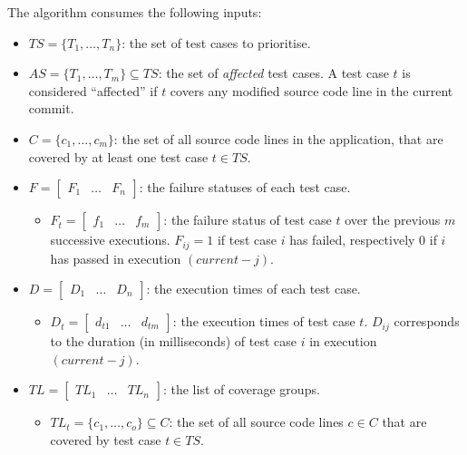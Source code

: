 \noindent The algorithm consumes the following inputs:
\begin{itemize}
	\item $TS = \{T_1, \dots, T_n\}$: the set of test cases to prioritise.
	
	\item $AS = \{T_1, \dots, T_m\} \subseteq TS$: the set of \emph{affected} test cases. A test case $t$ is considered ``affected'' if $t$ covers any modified source code line in the current commit.
	
	\item $C = \{c_1, \dots, c_m\}$: the set of all source code lines in the application, that are covered by at least one test case $t \in TS$.
	
	\item $F = \begin{bmatrix}
			F_1 & \dots & F_n
		\end{bmatrix}$: the failure statuses of each test case.
			\begin{itemize}
				\item $F_t = \begin{bmatrix}
					f_1 & \dots & f_m
				\end{bmatrix}$: the failure status of test case $t$ over the previous $m$ successive executions. $F_{ij} = 1$ if test case $i$ has failed, respectively $0$ if $i$ has passed in execution $(current - j)$.
			\end{itemize}
			
	\item $D = \begin{bmatrix}
			D_1 & \dots & D_n
		\end{bmatrix}$: the execution times of each test case.
			\begin{itemize}
				\item $D_t = \begin{bmatrix}
					d_{t1} & \dots & d_{tm}
				\end{bmatrix}$: the execution times of test case $t$. $D_{ij}$ corresponds to the duration (in milliseconds) of test case $i$ in execution $(current - j)$.
			\end{itemize}
	
	\item $TL = \begin{bmatrix}
			TL_1 & \dots & TL_n
		\end{bmatrix}$: the list of coverage groups.
			\begin{itemize}
				\item $TL_t = \{c_1, \dots, c_o\} \subseteq C$: the set of all source code lines $c \in C$ that are covered by test case $t \in TS$.
			\end{itemize}
\end{itemize}


